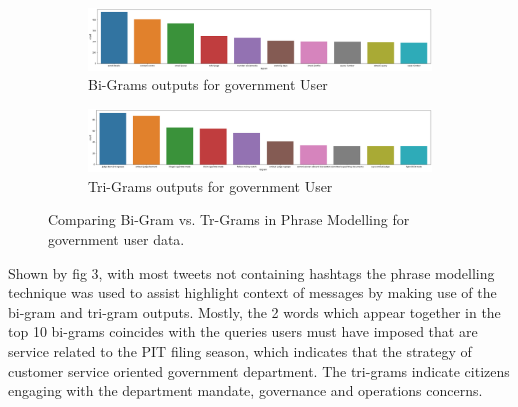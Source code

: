 \begin{figure}
      \centering
	    \begin{subfigure}{0.3\linewidth}
		\includegraphics[width=\linewidth]{postgrad_template 2/chapters/chapter1/Bigrams User Data.png}
		\caption{Bi-Grams outputs for government User}
		\label{fig: Associated Bi-Grams Outputs}
	   \end{subfigure}
	   \begin{subfigure}{0.3\linewidth}
		\includegraphics[width=\linewidth]{postgrad_template 2/chapters/chapter1/Tri-gram User Data.png}
		\caption{Tri-Grams outputs for government User}
		\label{fig:Associated Tri-Gram Outputs}
	    \end{subfigure}
	   \vfill
	 \caption{Comparing Bi-Gram vs. Tr-Grams in Phrase Modelling for government user data.}
\end{figure}

Shown by fig 3, with most tweets not containing hashtags the phrase modelling technique was used to assist highlight context of messages by making use of the bi-gram and tri-gram outputs. Mostly, the 2 words which appear together in the top 10 bi-grams coincides with the queries users must have imposed that are service related to the PIT filing season, which indicates that the strategy of customer service oriented government department.  The tri-grams indicate citizens engaging with the department mandate, governance and operations concerns.

